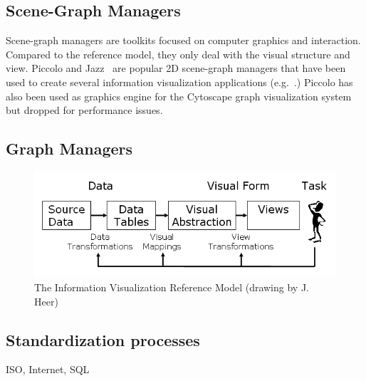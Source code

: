 \subsection{Scene-Graph Managers}

Scene-graph managers are toolkits focused on computer graphics and
interaction.  Compared to the reference model, they only deal with the
visual structure and view.  Piccolo and Jazz~\cite{Polylithic} are
popular 2D scene-graph managers that have been used to create several
information visualization applications
(e.g.~\cite{SpaceTree,Geneaquilt}.) Piccolo has also been used as
graphics engine for the Cytoscape graph visualization
system~\cite{Cytoscape} but dropped for performance issues.

\subsection{Graph Managers}




\begin{figure}
\includegraphics[width=\columnwidth]{figures/reference_model}
\caption{The Information Visualization Reference Model (drawing by
  J. Heer)}
\label{fig:refmodel}
\end{figure}


\subsection{Standardization processes}
ISO, Internet, SQL






